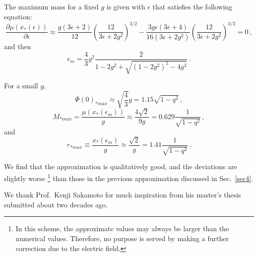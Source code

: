 \documentclass[
aps,prd,
12pt,%
nopreprintnumbers,
showpacs,
eqsecnum,
nofootinbib
]{revtex4-1}
\begin{document}
The maximum mass for a fixed $g$ is given with $\epsilon$ that satisfies the
following equation:
\begin{equation}
\frac{\partial \mu(x_*(\epsilon))}{\partial
\epsilon}\approx
\frac{g(3\epsilon+2)}{12}\left(\frac{12}{3\epsilon+2g^2}\right)^{3/2}
-\frac{3g\epsilon(3\epsilon+4)}{16(3\epsilon+2g^2)}
\left(\frac{12}{3\epsilon+2g^2}\right)^{3/2}=0\,,
\end{equation}
and then
\begin{equation}
\epsilon_m=\frac{4}{3}g^2\frac{2}{1-2g^2+\sqrt{(1-2g^2)^2-4g^2}}\,.
\end{equation}

For a small $g$,
\begin{equation}
\Phi(0)_{*max}\approx\sqrt{\frac{4}{3}}g=1.15{\sqrt{1-q^2}}\,,
\end{equation}
\begin{equation}
M_{*max}=\frac{\mu(x_*(\epsilon_m))}{g}\approx\frac{4\sqrt{2}}{9g}=0.629\frac{1}{\sqrt{1-q^2}}\,,
\end{equation}
and
\begin{equation}
r_{*max}\equiv
\frac{x_*(\epsilon_m)}{g}\approx\frac{\sqrt{2}}{g}=1.41\frac{1}{\sqrt{1-q^2}}\,.
\end{equation}

We find that the approximation is qualitatively good, and the deviations are
slightly worse%
\footnote{In this scheme, the approximate values may always be larger than the
numerical values. Therefore, no purpose is served by making a further
correction due to the electric field.}
 than those in the previous approximation discussed in
Sec.~\ref{sec4}.

\acknowledgments

We thank Prof.~Kenji Sakamoto for much inspiration from his master's thesis
submitted about two decades ago.

\end{document}
